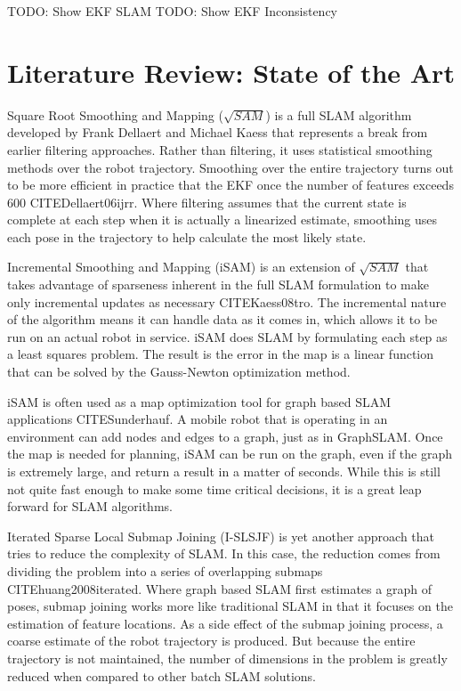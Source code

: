\documentclass[12pt]{report}
\begin{document}
TODO: Show EKF SLAM
TODO: Show EKF Inconsistency

\chapter{Literature Review: State of the Art}

Square Root Smoothing and Mapping ($\sqrt{SAM}$) is a full SLAM algorithm developed by Frank Dellaert and Michael Kaess that represents a break from earlier filtering approaches. Rather than filtering, it uses statistical smoothing methods over the robot trajectory.  Smoothing over the entire trajectory turns out to be more efficient in practice that the EKF once the number of features exceeds 600 CITE{Dellaert06ijrr}.  Where filtering assumes that the current state is complete at each step when it is actually a linearized estimate, smoothing uses each pose in the trajectory to help calculate the most likely state.

Incremental Smoothing and Mapping (iSAM) is an extension of $\sqrt{SAM}$ that takes advantage of sparseness inherent in the full SLAM formulation to make only incremental updates as necessary CITE{Kaess08tro}. The incremental nature of the algorithm means it can handle data as it comes in, which allows it to be run on an actual robot in service.  iSAM does SLAM by formulating each step as a least squares problem.  The result is the error in the map is a linear function that can be solved by the Gauss-Newton optimization method.

iSAM is often used as a map optimization tool for graph based SLAM applications CITE{Sunderhauf}.  A mobile robot that is operating in an environment can add nodes and edges to a graph, just as in GraphSLAM.  Once the map is needed for planning, iSAM can be run on the graph, even if the graph is extremely large, and return a result in a matter of seconds.  While this is still not quite fast enough to make some time critical decisions, it is a great leap forward for SLAM algorithms.

Iterated Sparse Local Submap Joining (I-SLSJF) is yet another approach that tries to reduce the complexity of SLAM.  In this case, the reduction comes from dividing the problem into a series of overlapping submaps  CITE{huang2008iterated}.  Where graph based SLAM first estimates a graph of poses, submap joining works more like traditional SLAM in that it focuses on the estimation of feature locations.  As a side effect of the submap joining process, a coarse estimate of the robot trajectory is produced.  But because the entire trajectory is not maintained, the number of dimensions in the problem is greatly reduced when compared to other batch SLAM solutions.
\end{document}
